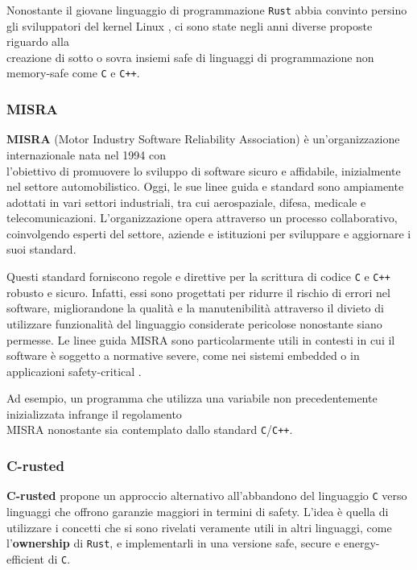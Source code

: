 Nonostante il giovane linguaggio di programmazione \texttt{Rust} abbia convinto persino gli sviluppatori del kernel Linux \cite{RustInKernel}, ci sono state negli anni diverse proposte riguardo alla \\creazione di sotto o sovra insiemi safe di linguaggi di programmazione non memory-safe come \texttt{C} e \texttt{C++}.

\subsubsection{MISRA}
\textbf{MISRA} (Motor Industry Software Reliability Association) è un'organizzazione internazionale nata nel 1994 con \\l'obiettivo di promuovere lo sviluppo di software sicuro e affidabile, inizialmente nel settore automobilistico. Oggi, le sue linee guida e standard sono ampiamente adottati in vari settori industriali, tra cui aerospaziale, difesa, medicale e telecomunicazioni. L'organizzazione opera attraverso un processo collaborativo, coinvolgendo esperti del settore, aziende e istituzioni per sviluppare e aggiornare i suoi standard.

Questi standard forniscono regole e direttive per la scrittura di codice \texttt{C} e \texttt{C++} robusto e sicuro. Infatti, essi sono progettati per ridurre il rischio di errori nel software, migliorandone la qualità e la manutenibilità attraverso il divieto di utilizzare funzionalità del linguaggio considerate pericolose nonostante siano permesse. Le linee guida MISRA sono particolarmente utili in contesti in cui il software è soggetto a normative severe, come nei sistemi embedded o in applicazioni safety-critical \cite{MISRA}. 

Ad esempio, un programma che utilizza una variabile non precedentemente inizializzata infrange il regolamento\\ MISRA nonostante sia contemplato dallo standard \texttt{C}/\texttt{C++}.

\subsubsection{C-rusted}
\textbf{C-rusted} propone un approccio alternativo all'abbandono del linguaggio \texttt{C} verso linguaggi che offrono garanzie maggiori in termini di safety. L'idea è quella di utilizzare i concetti che si sono rivelati veramente utili in altri linguaggi, come l'\textbf{ownership} di \texttt{Rust}, e implementarli in una versione safe, secure e energy-efficient di \texttt{C}.

